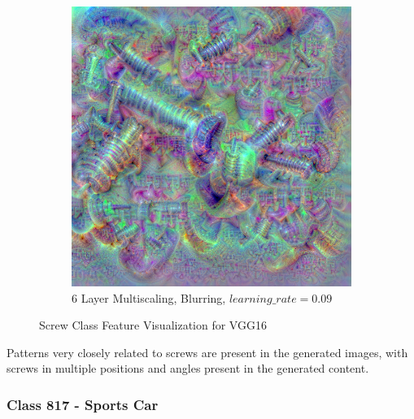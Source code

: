 \begin{figure}
\begin{subfigure}[t]{0.31\textwidth}
    \end{subfigure}
    \hfill
    \begin{subfigure}[t]{0.31\textwidth}
        \captionsetup{justification=centering}
        \centering
        \includegraphics[width=.7\linewidth]{figuras/feat_vis/experiments/classes/cl783/random_image_ci783_lr9e-2_pl6.png}
        \caption{6 Layer Multiscaling, Blurring, \(learning\_rate = 0.09\)}
    \end{subfigure}

    \caption{Screw Class Feature Visualization for VGG16}
    \label{fig:class_screw}
\end{figure}

Patterns very closely related to screws are present in the generated images, with screws in multiple positions and angles present in the generated content.

\newpage
\subsubsection{Class 817 - Sports Car}

